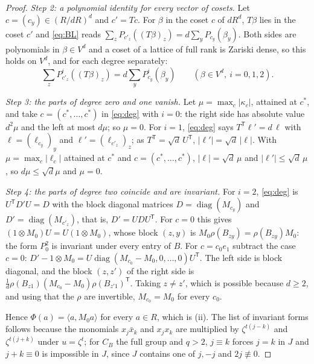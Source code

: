 \begin{proof}
\emph{Step 2: a polynomial identity for every vector of cosets.} Let $c=(c_y)\in(R/dR)^d$ and $c'=Tc$. For $\beta$ in the coset $c$ of $dR^d$, $T\beta$ lies in the coset $c'$ and \eqref{eq:BL} reads $\sum_zP_{c'_z}((T\beta)_z)=d\sum_yP_{c_y}(\beta_y)$. Both sides are polynomials in $\beta\in V^d$ and a coset of a lattice of full rank is Zariski dense, so this holds on $V^d$, and for each degree separately:
\begin{equation}\label{eq:deg}
\sum_zP^i_{c'_z}((T\beta)_z)=d\sum_yP^i_{c_y}(\beta_y)\qquad(\beta\in V^d,\ i=0,1,2).
\end{equation}

\emph{Step 3: the parts of degree zero and one vanish.} Let $\mu=\max_c|\kappa_c|$, attained at $c^*$, and take $c=(c^*,\dots,c^*)$ in \eqref{eq:deg} with $i=0$: the right side has absolute value $d^2\mu$ and the left at most $d\mu$; so $\mu=0$. For $i=1$, \eqref{eq:deg} says $T^{\mathsf T}\ell'=d\,\ell$ with $\ell=(\ell_{c_y})_y$ and $\ell'=(\ell_{c'_z})_z$; as $T^{\mathsf T}=\sqrt d\,U^{\mathsf T}$, $|\ell'|=\sqrt d\,|\ell|$. With $\mu=\max_c|\ell_c|$ attained at $c^*$ and $c=(c^*,\dots,c^*)$, $|\ell|=\sqrt d\,\mu$ and $|\ell'|\le\sqrt d\,\mu$, so $d\mu\le\sqrt d\mu$ and $\mu=0$.

\emph{Step 4: the parts of degree two coincide and are invariant.} For $i=2$, \eqref{eq:deg} is $U^{\mathsf T}D'U=D$ with the block diagonal matrices $D=\operatorname{diag}(M_{c_y})$ and $D'=\operatorname{diag}(M_{c'_z})$, that is, $D'=UDU^{\mathsf T}$. For $c=0$ this gives $(1\otimes M_0)U=U(1\otimes M_0)$, whose block $(z,y)$ is $M_0\rho(B_{zy})=\rho(B_{zy})M_0$: the form $P^2_0$ is invariant under every entry of $B$. For $c=c_0e_1$ subtract the case $c=0$: $D'-1\otimes M_0=U\operatorname{diag}(M_{c_0}-M_0,0,\dots,0)U^{\mathsf T}$. The left side is block diagonal, and the block $(z,z')$ of the right side is $\tfrac1d\rho(B_{z1})(M_{c_0}-M_0)\rho(B_{z'1})^{\mathsf T}$. Taking $z\ne z'$, which is possible because $d\ge2$, and using that the $\rho$ are invertible, $M_{c_0}=M_0$ for every $c_0$.

Hence $\Phi(a)=\langle a,M_0a\rangle$ for every $a\in R$, which is (ii). The list of invariant forms follows because the monomials $x_j\bar x_k$ and $x_jx_k$ are multiplied by $\zeta^{t(j-k)}$ and $\zeta^{t(j+k)}$ under $u=\zeta^t$; for $C_B$ the full group and $q>2$, $j\equiv k$ forces $j=k$ in $J$ and $j+k\equiv0$ is impossible in $J$, since $J$ contains one of $j,-j$ and $2j\not\equiv0$.
\end{proof}


